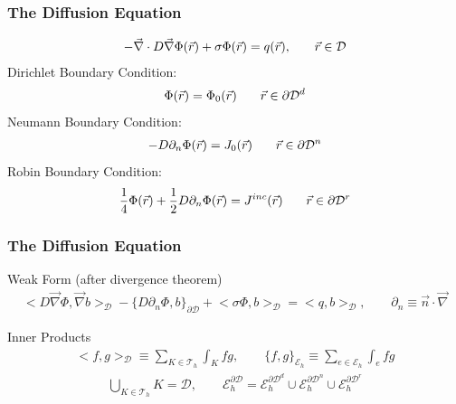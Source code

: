 \documentclass[]{beamer}
\begin{document}
\subsection{}
\begin{frame}[t]\frametitle{The Diffusion Equation}
	\begin{block}{} {\small 
     		\begin{align*}
 	 		{ \small -\vec{\nabla} \cdot D \vec{\nabla} \Phi (\vec{r}) + \sigma \Phi (\vec{r}) = q (\vec{r}), \qquad  \vec{r} \in \mathcal{D} }
        	\end{align*} 
		Dirichlet Boundary Condition:
		\begin{align*}
 	 		{ \small \Phi (\vec{r})  = \Phi_0 (\vec{r})  \qquad \vec{r} \in \partial \mathcal{D}^d }
        	\end{align*} 
		Neumann Boundary Condition:
		\begin{align*}
 	 		{ \small -D \partial_n \Phi (\vec{r})  = J_0 (\vec{r})  \qquad \vec{r} \in \partial \mathcal{D}^n }
        	\end{align*} 
		Robin Boundary Condition:
		\begin{align*}
 	 		{ \small \frac{1}{4} \Phi (\vec{r})  + \frac{1}{2}D \partial_n \Phi (\vec{r})  = J^{inc} (\vec{r})  \qquad \vec{r} \in \partial \mathcal{D}^r}
        	\end{align*} }
    \end{block}
\end{frame}
\begin{frame}[t]\frametitle{The Diffusion Equation}
	\begin{block}{Weak Form (after divergence theorem)} {\small
		\begin{gather*}
			\Big<  D \vec{\nabla}  \Phi , \vec{\nabla} b  \Big>_{\mathcal{D}} - \Big\{    D \partial_n \Phi, b \Big\}_{\partial \mathcal{D}} + \Big< \sigma  \Phi ,  b  \Big>_{\mathcal{D}} = \Big<q,  b  \Big>_{\mathcal{D}}, \qquad \partial_n \equiv \vec{n} \cdot \vec{\nabla}
		\end{gather*}}
	\end{block}
	\begin{block}{Inner Products} {\small
		\begin{gather*}
			\Big<  f , g  \Big>_{\mathcal{D}} \equiv \sum_{K \in \mathcal{T}_h} \int_{K} f  g,  \qquad \Big\{  f , g  \Big\}_{ \mathcal{E}_h} \equiv \sum_{e \in \mathcal{E}_h} \int_{e} f  g
		\end{gather*}
		\begin{gather*}
			\bigcup_{K \in \mathcal{T}_h} K = \mathcal{D},  \qquad \mathcal{E}_h^{\partial \mathcal{D}} =  \mathcal{E}_h^{\partial \mathcal{D}^d} \cup \mathcal{E}_h^{\partial \mathcal{D}^n} \cup \mathcal{E}_h^{\partial \mathcal{D}^r}
		\end{gather*}
	}\end{block}
\end{frame}
\end{document}
